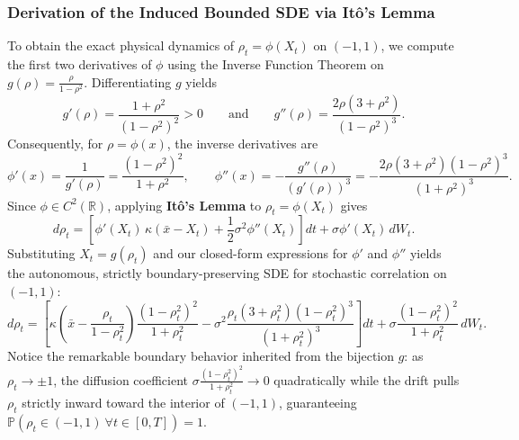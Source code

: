 \documentclass[11pt, letterpaper]{article}
\theoremstyle{definition}
\theoremstyle{remark}
\begin{document}
\subsubsection{Derivation of the Induced Bounded SDE via It\^o's Lemma}
To obtain the exact physical dynamics of $\rho_t = \phi(X_t)$ on $(-1, 1)$, we compute the first two derivatives of $\phi$ using the Inverse Function Theorem on $g(\rho) = \frac{\rho}{1 - \rho^2}$. Differentiating $g$ yields
\[
g'(\rho) = \frac{1 + \rho^2}{(1 - \rho^2)^2} > 0 \qquad \text{and} \qquad g''(\rho) = \frac{2\rho(3 + \rho^2)}{(1 - \rho^2)^3}.
\]
Consequently, for $\rho = \phi(x)$, the inverse derivatives are
\[
\phi'(x) = \frac{1}{g'(\rho)} = \frac{(1 - \rho^2)^2}{1 + \rho^2}, \qquad \phi''(x) = -\frac{g''(\rho)}{\left(g'(\rho)\right)^3} = -\frac{2\rho(3 + \rho^2)(1 - \rho^2)^3}{(1 + \rho^2)^3}.
\]
Since $\phi \in C^2(\mathbb{R})$, applying \textbf{It\^o's Lemma} to $\rho_t = \phi(X_t)$ gives
\[
d\rho_t = \left[\phi'(X_t)\,\kappa(\bar{x} - X_t) + \frac{1}{2}\sigma^2 \phi''(X_t)\right] dt + \sigma \phi'(X_t)\, dW_t.
\]
Substituting $X_t = g(\rho_t)$ and our closed-form expressions for $\phi'$ and $\phi''$ yields the autonomous, strictly boundary-preserving SDE for stochastic correlation on $(-1, 1)$:
\begin{equation}
d\rho_t = \left[\kappa\left(\bar{x} - \frac{\rho_t}{1 - \rho_t^2}\right)\frac{(1 - \rho_t^2)^2}{1 + \rho_t^2} - \sigma^2 \frac{\rho_t(3 + \rho_t^2)(1 - \rho_t^2)^3}{(1 + \rho_t^2)^3}\right] dt + \sigma \frac{(1 - \rho_t^2)^2}{1 + \rho_t^2}\, dW_t.
\end{equation}
Notice the remarkable boundary behavior inherited from the bijection $g$: as $\rho_t \to \pm 1$, the diffusion coefficient $\sigma \frac{(1 - \rho_t^2)^2}{1 + \rho_t^2} \to 0$ quadratically while the drift pulls $\rho_t$ strictly inward toward the interior of $(-1, 1)$, guaranteeing $\mathbb{P}\left(\rho_t \in (-1, 1)\ \forall t \in [0, T]\right) = 1$.
\end{document}
